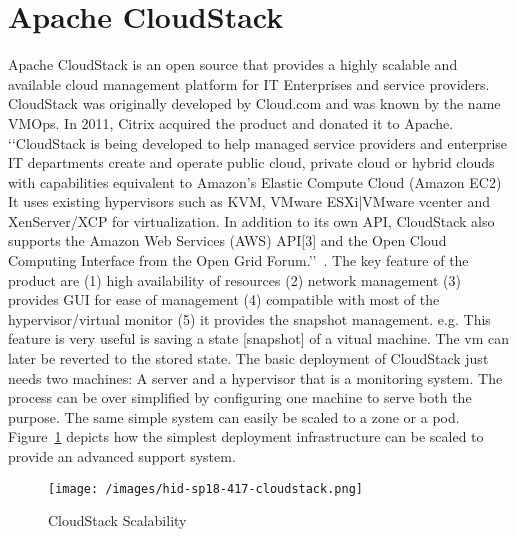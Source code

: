 
\section{Apache CloudStack}
Apache CloudStack is an open source that provides a highly scalable
and available cloud management platform for IT Enterprises and service
providers. CloudStack was originally developed by Cloud.com and was
known by the name VMOps.  In 2011, Citrix acquired the product and
donated it to Apache.
‘‘CloudStack is being developed to help managed service providers and
enterprise IT departments create and operate public cloud, private
cloud or hybrid clouds with capabilities equivalent to Amazon's
Elastic Compute Cloud (Amazon EC2) It uses existing hypervisors such
as KVM, VMware ESXi|VMware vcenter and XenServer/XCP for
virtualization. In addition to its own API, CloudStack also supports
the Amazon Web Services (AWS) API[3] and the Open Cloud Computing
Interface from the Open Grid Forum.’’~\cite{hid-sp18-417-wiki-cloudStack}.
The key feature of the product are 
 (1) high availability of resources
 (2) network management
 (3) provides GUI for ease of management
 (4) compatible with most of the hypervisor/virtual monitor
 (5) it provides the snapshot management. e.g. This feature is 
very useful is saving a state [snapshot] of a vitual machine. 
The vm can later be reverted to the stored state.  
The basic deployment of CloudStack just needs two machines: 
 A server and a hypervisor that is a monitoring system.  The process
can be over simplified by configuring one machine to serve both the
purpose.
The same simple system can easily be scaled to a zone or a pod.
Figure~\ref{F:cloudstack-scalabuility} depicts how the simplest
deployment infrastructure can be scaled to provide an advanced support
system.
\begin{figure}[htb]
\texttt{[image: /images/hid-sp18-417-cloudstack.png]}
\caption{CloudStack Scalability~\cite{hid-sp18-417-cloudstack-scaling}}
\label{F:cloudstack-scalabuility}
\end{figure}
